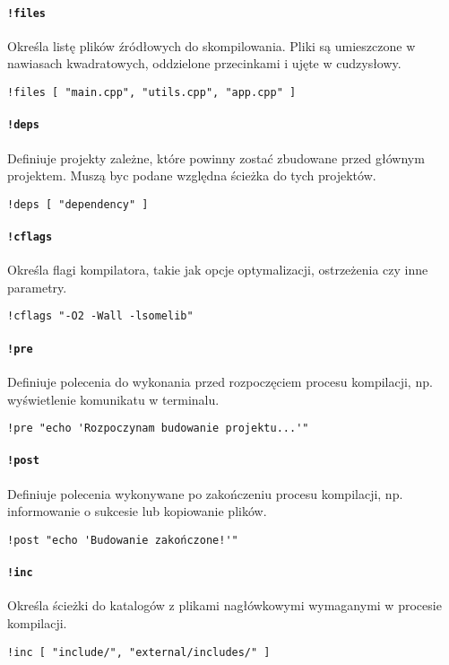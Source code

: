 \paragraph{\texttt{!files}} Określa listę plików źródłowych do skompilowania. Pliki są umieszczone w nawiasach kwadratowych, oddzielone przecinkami i ujęte w cudzysłowy.
\begin{verbatim}
!files [ "main.cpp", "utils.cpp", "app.cpp" ]
\end{verbatim}

\paragraph{\texttt{!deps}} Definiuje projekty zależne, które powinny zostać zbudowane przed głównym projektem. Muszą byc podane względna ścieżka do tych projektów.
\begin{verbatim}
!deps [ "dependency" ]
\end{verbatim}

\paragraph{\texttt{!cflags}} Określa flagi kompilatora, takie jak opcje optymalizacji, ostrzeżenia czy inne parametry.
\begin{verbatim}
!cflags "-O2 -Wall -lsomelib"
\end{verbatim}

\paragraph{\texttt{!pre}} Definiuje polecenia do wykonania przed rozpoczęciem procesu kompilacji, np. wyświetlenie komunikatu w terminalu.
\begin{verbatim}
!pre "echo 'Rozpoczynam budowanie projektu...'"
\end{verbatim}

\paragraph{\texttt{!post}} Definiuje polecenia wykonywane po zakończeniu procesu kompilacji, np. informowanie o sukcesie lub kopiowanie plików.
\begin{verbatim}
!post "echo 'Budowanie zakończone!'"
\end{verbatim}

\paragraph{\texttt{!inc}} Określa ścieżki do katalogów z plikami nagłówkowymi wymaganymi w procesie kompilacji.
\begin{verbatim}
!inc [ "include/", "external/includes/" ]
\end{verbatim}

